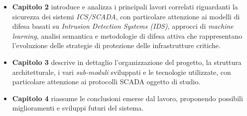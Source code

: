 \begin{itemize}
    \item \textbf{Capitolo 2} introduce e analizza i principali lavori correlati riguardanti la sicurezza dei sistemi \textit{ICS/SCADA}, con particolare attenzione ai modelli di difesa basati su \textit{Intrusion Detection Systems (IDS)}, approcci di \textit{machine learning}, analisi semantica e metodologie di difesa attiva che rappresentano l’evoluzione delle strategie di protezione delle infrastrutture critiche.    
    \item \textbf{Capitolo 3} descrive in dettaglio l’organizzazione del progetto, la struttura architetturale, i vari \textit{sub-moduli} sviluppati e le tecnologie utilizzate, con particolare attenzione ai protocolli SCADA oggetto di studio.  
    \item \textbf{Capitolo 4} riassume le conclusioni emerse dal lavoro, proponendo possibili miglioramenti e sviluppi futuri del sistema.  
\end{itemize}
